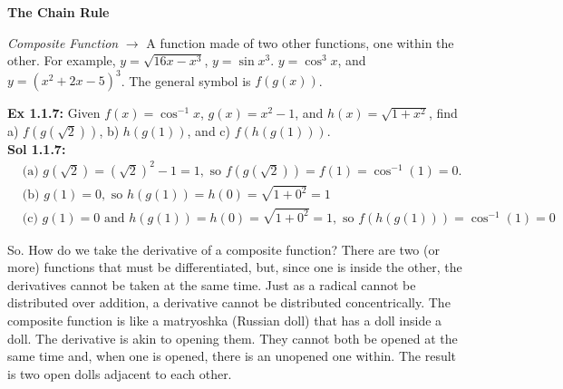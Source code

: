 \newpage

\textbf{\large{The Chain Rule}} \par

\textit{Composite Function} $\rightarrow$ A function made of two other functions, one within the other. For example, $y = \sqrt{16x - x^3}$, $y = \sin{x^3}$. $y = \cos^3{x}$, and $y = \left(x^2 + 2x - 5\right)^3$. The general symbol is $f(g(x))$. \par

\textbf{Ex 1.1.7:} Given $f(x) = \cos^{-1} x$, $g(x) = x^2 - 1$, and $h(x) = \sqrt{1 + x^2}$, find a) $f\left(g\left(\sqrt{2}\right)\right)$, b) $h(g(1))$, and c) $f(h(g(1)))$. \\[11pt]
\textbf{Sol 1.1.7:} \begin{align*}
    &\text{(a) } g\left(\sqrt{2}\right) = \left(\sqrt{2}\right)^2 - 1 = 1, \text{ so } f\left(g\left(\sqrt{2}\right)\right) = f(1) = \cos^{-1}(1) = \boxed{0}. \\[11pt]
    &\text{(b) } g(1) = 0, \text{ so } h(g(1)) = h(0) = \sqrt{1 + 0^2} = \boxed{1} \\[11pt]
    &\text{(c) } g(1) = 0 \text{ and } h(g(1)) = h(0) = \sqrt{1 + 0^2} = 1, \text{ so } f(h(g(1))) = \cos^{-1}(1) = \boxed{0}
\end{align*}

So. How do we take the derivative of a composite function? There are two (or more) functions that must be differentiated, but, since one is inside the other, the derivatives cannot be taken at the same time. Just as a radical cannot be distributed over addition, a derivative cannot be distributed concentrically. The composite function is like a matryoshka (Russian doll) that has a doll inside a doll. The derivative is akin to opening them. They cannot both be opened at the same time and, when one is opened, there is an unopened one within. The result is two open dolls adjacent to each other. 

\begin{center}
\end{center}

